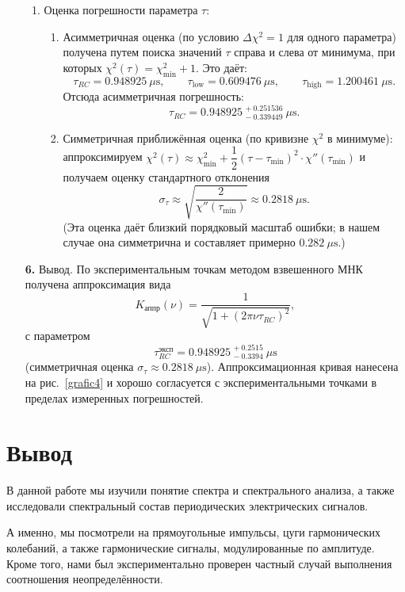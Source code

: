\documentclass[a4paper,12pt]{article}
\begin{document}
\begin{enumerate}
\begin{enumerate}
  \item Оценка погрешности параметра $\tau$:
  \begin{enumerate}
    \item Асимметричная оценка (по условию $\Delta\chi^2=1$ для одного параметра) получена путем поиска значений $\tau$ справа и слева от минимума, при которых $\chi^2(\tau)=\chi^2_{\min}+1$. Это даёт:
    \[
    \tau_{RC} = 0.948925\ \mu\text{s},\qquad
    \tau_{\text{low}} = 0.609476\ \mu\text{s},\qquad
    \tau_{\text{high}} = 1.200461\ \mu\text{s}.
    \]
    Отсюда асимметричная погрешность:
    \[
    \tau_{RC} = 0.948925^{\,+0.251536}_{\,-0.339449}\ \mu\text{s}.
    \]

    \item Симметричная приближённая оценка (по кривизне $\chi^2$ в минимуме): аппроксимируем $\chi^2(\tau)\approx\chi^2_{\min} + \dfrac{1}{2}(\tau-\tau_{\min})^2\cdot \chi''(\tau_{\min})$ и получаем оценку стандартного отклонения
    \[
    \sigma_\tau \approx \sqrt{\frac{2}{\chi''(\tau_{\min})}} \approx 0.2818\ \mu\text{s}.
    \]
    (Эта оценка даёт близкий порядковый масштаб ошибки; в нашем случае она симметрична и составляет примерно $0.282\ \mu\text{s}$.)
  \end{enumerate}
\end{enumerate}

\item [\textbf{6.}] Вывод. По экспериментальным точкам методом взвешенного МНК получена аппроксимация вида
\[
K_{\text{аппр}}(\nu) = \frac{1}{\sqrt{1 + (2 \pi \nu \tau_{RC})^2}},
\]
с параметром
\[
\tau_{RC}^{\text{эксп}} = 0.948925^{\,+0.2515}_{\,-0.3394}\ \mu\text{s}
\]
(симметричная оценка $\sigma_{\tau}\approx 0.2818\ \mu\text{s}$). Аппроксимационная кривая нанесена на рис.~\ref{grafic4} и хорошо согласуется с экспериментальными точками в пределах измеренных погрешностей.  
\end{enumerate}




\section*{Вывод}
В данной работе мы изучили понятие спектра и спектрального анализа, а также исследовали спектральный состав периодических электрических сигналов.

А именно, мы посмотрели на прямоугольные импульсы, цуги гармонических колебаний, а также гармонические сигналы, модулированные по амплитуде. Кроме того, нами был экспериментально проверен частный случай выполнения соотношения неопределённости.
\end{document}
